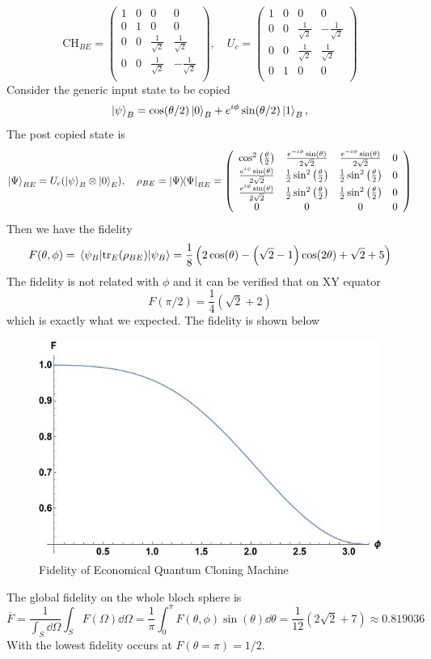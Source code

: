 \[
\text{CH}_{BE}=\left(
    \begin{array}{cccc}
     1 & 0 & 0 & 0 \\
     0 & 1 & 0 & 0 \\
     0 & 0 & \frac{1}{\sqrt{2}} & \frac{1}{\sqrt{2}} \\
     0 & 0 & \frac{1}{\sqrt{2}} & -\frac{1}{\sqrt{2}} \\
    \end{array}
    \right), \quad
    U_c=
    \left(
\begin{array}{cccc}
 1 & 0 & 0 & 0 \\
 0 & 0 & \frac{1}{\sqrt{2}} & -\frac{1}{\sqrt{2}} \\
 0 & 0 & \frac{1}{\sqrt{2}} & \frac{1}{\sqrt{2}} \\
 0 & 1 & 0 & 0 \\
\end{array}
\right)
\]
Consider the generic input state to be copied
\[
    \ket{\psi}_B=\cos(\theta/2)\ket{0}_B+e^{i\phi}\sin(\theta/2)\ket{1}_B,
\]
The post copied state is 
\[
    \ket{\Psi}_{BE}=U_c(\ket{\psi}_B\otimes \ket{0}_E), \quad \rho_{BE}=\ketbra{\Psi}_{BE}=
    \left(
\begin{array}{cccc}
 \cos ^2\left(\frac{\theta }{2}\right) & \frac{e^{-i \phi } \sin (\theta )}{2 \sqrt{2}} & \frac{e^{-i \phi } \sin (\theta )}{2 \sqrt{2}} & 0 \\
 \frac{e^{i \phi } \sin (\theta )}{2 \sqrt{2}} & \frac{1}{2} \sin ^2\left(\frac{\theta }{2}\right) & \frac{1}{2} \sin ^2\left(\frac{\theta }{2}\right) & 0 \\
 \frac{e^{i \phi } \sin (\theta )}{2 \sqrt{2}} & \frac{1}{2} \sin ^2\left(\frac{\theta }{2}\right) & \frac{1}{2} \sin ^2\left(\frac{\theta }{2}\right) & 0 \\
 0 & 0 & 0 & 0 \\
\end{array}
\right)
\]
Then we have the fidelity 
\[
F(\theta,\phi)=\expval{\tr_E(\rho_{BE})}{\psi_B}=\frac{1}{8} \left(2 \cos (\theta )-\left(\sqrt{2}-1\right) \cos (2 \theta )+\sqrt{2}+5\right)
\]
The fidelity is not related with $\phi$ and it can be verified that on XY equator 
\[F(\pi/2)=\frac{1}{4} \left(\sqrt{2}+2\right)\]
which is exactly what we expected.
The fidelity is shown below
\begin{figure}[h]
    \centering
    \includegraphics[width=0.5\linewidth]{F.jpeg}
    \caption{Fidelity of Economical Quantum Cloning Machine}
\end{figure}
The global fidelity on the whole bloch sphere is 
\[
    \overline{F}=\frac{1}{\int_S \dd{\Omega}}\int_S F(\Omega)\dd{\Omega}=\frac{1}{\pi}\int_0^\pi F(\theta,\phi)\sin(\theta)\dd{\theta}
    =\frac{1}{12} \left(2 \sqrt{2}+7\right)\approx 0.819036
\]
With the lowest fidelity occurs at $F(\theta=\pi)=1/2$.

